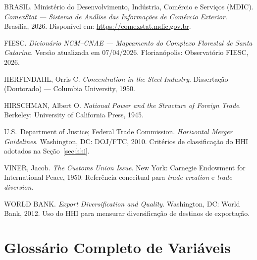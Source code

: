 \documentclass[12pt, a4paper]{article}
\begin{document}
\begin{enumerate}[label={[\arabic*]}]
  \item BRASIL. Ministério do Desenvolvimento, Indústria, Comércio e
    Serviços (MDIC). \textit{ComexStat --- Sistema de Análise das Informações
    de Comércio Exterior}. Brasília, 2026.
    Disponível em: \url{https://comexstat.mdic.gov.br}.

  \item FIESC. \textit{Dicionário NCM--CNAE --- Mapeamento do Complexo
    Florestal de Santa Catarina}. Versão atualizada em 07/04/2026.
    Florianópolis: Observatório FIESC, 2026.

  \item HERFINDAHL, Orris C. \textit{Concentration in the Steel Industry}.
    Dissertação (Doutorado) --- Columbia University, 1950.

  \item HIRSCHMAN, Albert O. \textit{National Power and the Structure of
    Foreign Trade}. Berkeley: University of California Press, 1945.

  \item U.S.\ Department of Justice; Federal Trade Commission.
    \textit{Horizontal Merger Guidelines}. Washington, DC: DOJ/FTC, 2010.
    Critérios de classificação do HHI adotados na Seção~\ref{sec:hhi}.

  \item VINER, Jacob. \textit{The Customs Union Issue}. New York: Carnegie
    Endowment for International Peace, 1950.
    Referência conceitual para \textit{trade creation} e
    \textit{trade diversion}.

  \item WORLD BANK. \textit{Export Diversification and Quality}.
    Washington, DC: World Bank, 2012.
    Uso do HHI para mensurar diversificação de destinos de exportação.
\end{enumerate}

\appendix

\section{Glossário Completo de Variáveis}
\label{app:glossario}
\end{document}

